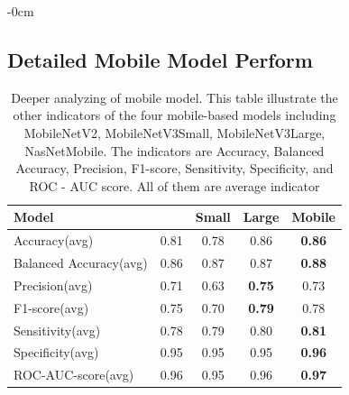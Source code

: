 \documentclass[sensors,article,submit,pdftex,moreauthors]{Definitions/mdpi}
\begin{document}
\begin{adjustwidth}{-\extralength}{0cm}
\subsection[\appendixname~\thesection]{Detailed Mobile Model Perform}
\begin{table}[H]
	\centering	
	\begin{tabular}{|l | c | c | c | c|} 
		\hline
		Model & \cite{04381} & \cite{02244}Small & \cite{02244}Large & \cite{07012}Mobile\\
		\hline
		Accuracy(avg) & 0.81 & 0.78 & 0.86 & \textbf{0.86}\\
		\hline
		Balanced Accuracy(avg) & 0.86 & 0.87 & 0.87 & \textbf{0.88}\\ 
		\hline
		Precision(avg) & 0.71 & 0.63 & \textbf{0.75} & 0.73\\
		\hline
		F1-score(avg) & 0.75 & 0.70 & \textbf{0.79} & 0.78\\
		\hline
		Sensitivity(avg) & 0.78 & 0.79 & 0.80 & \textbf{0.81}\\ 
		\hline
		Specificity(avg) & 0.95 & 0.95 & 0.95 & \textbf{0.96}\\
		\hline
		ROC-AUC-score(avg) & 0.96 & 0.95 & 0.96 & \textbf{0.97}\\
		\hline
	\end{tabular}
	\caption{Deeper analyzing of mobile model. This table illustrate the other indicators of the four mobile-based models including MobileNetV2, MobileNetV3Small, MobileNetV3Large, NasNetMobile. The indicators are Accuracy, Balanced Accuracy, Precision, F1-score, Sensitivity, Specificity, and ROC - AUC score. All of them are average indicator}
	\label{appendix-table:mobile-performance}
\end{table} 




%

\begin{thebibliography}{999}


\end{thebibliography}
\end{adjustwidth}
\end{document}
